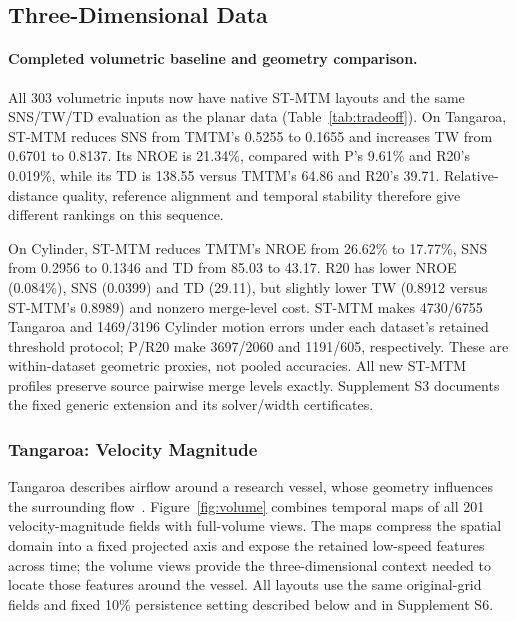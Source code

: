 \subsection{Three-Dimensional Data}\label{sec:results3d}


\paragraph{Completed volumetric baseline and geometry comparison.}
All 303 volumetric inputs now have native ST-MTM layouts and the same SNS/TW/TD evaluation as the planar data (Table~\ref{tab:tradeoff}). On Tangaroa, ST-MTM reduces SNS from TMTM's 0.5255 to 0.1655 and increases TW from 0.6701 to 0.8137. Its NROE is 21.34\%, compared with P's 9.61\% and R20's 0.019\%, while its TD is 138.55 versus TMTM's 64.86 and R20's 39.71. Relative-distance quality, reference alignment and temporal stability therefore give different rankings on this sequence.

On Cylinder, ST-MTM reduces TMTM's NROE from 26.62\% to 17.77\%, SNS from 0.2956 to 0.1346 and TD from 85.03 to 43.17. R20 has lower NROE (0.084\%), SNS (0.0399) and TD (29.11), but slightly lower TW (0.8912 versus ST-MTM's 0.8989) and nonzero merge-level cost. ST-MTM makes 4730/6755 Tangaroa and 1469/3196 Cylinder motion errors under each dataset's retained threshold protocol; P/R20 make 3697/2060 and 1191/605, respectively. These are within-dataset geometric proxies, not pooled accuracies. All new ST-MTM profiles preserve source pairwise merge levels exactly. Supplement S3 documents the fixed generic extension and its solver/width certificates.

\subsubsection{Tangaroa: Velocity Magnitude}\label{sec:volume}
Tangaroa describes airflow around a research vessel, whose geometry influences the surrounding flow~\cite{Popinet:2004:Tangaroa,Koepp:2023:TMTM}. Figure~\ref{fig:volume} combines temporal maps of all 201 velocity-magnitude fields with full-volume views. The maps compress the spatial domain into a fixed projected axis and expose the retained low-speed features across time; the volume views provide the three-dimensional context needed to locate those features around the vessel. All layouts use the same original-grid fields and fixed 10\% persistence setting described below and in Supplement S6.

